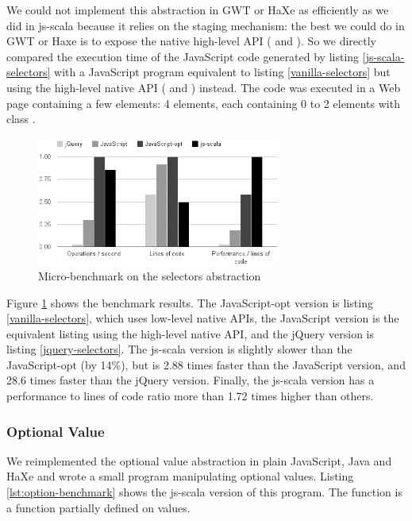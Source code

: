 \documentclass[preprint]{sigplanconf}
\begin{document}
We could not implement this abstraction in GWT or HaXe as efficiently as we did in js-scala because
it relies on the staging mechanism: the best we could do in GWT or Haxe is to expose the native
high-level API ( and ). So we directly compared the
execution time of the JavaScript code generated by listing \ref{js-scala-selectors} with a
JavaScript program equivalent to listing \ref{vanilla-selectors} but using the high-level native
API ( and ) instead. The code was executed in a Web page
containing a few elements: 4  elements, each containing 0 to 2 elements with class
.

\begin{figure}
\centering
\includegraphics[width=8cm]{selectors-benchmark.png}
\caption{Micro-benchmark on the selectors abstraction}
\label{fig:selectors-benchmark}
\end{figure}

Figure \ref{fig:selectors-benchmark} shows the benchmark results. The JavaScript-opt version is
listing \ref{vanilla-selectors}, which uses low-level native APIs, the JavaScript version is the
equivalent listing using the high-level native API, and the jQuery version is listing
\ref{jquery-selectors}. The js-scala version is slightly slower than the JavaScript-opt (by 14\%),
but is 2.88 times faster than the JavaScript version, and 28.6 times faster than the jQuery
version. Finally, the js-scala version has a performance to lines of code ratio more than 1.72
times higher than others.

\subsubsection{Optional Value}

We reimplemented the optional value abstraction in plain JavaScript, Java and HaXe and wrote a small
program manipulating optional values. Listing \ref{lst:option-benchmark} shows the js-scala
version of this program. The  function is a function partially defined on
 values.
\end{document}
